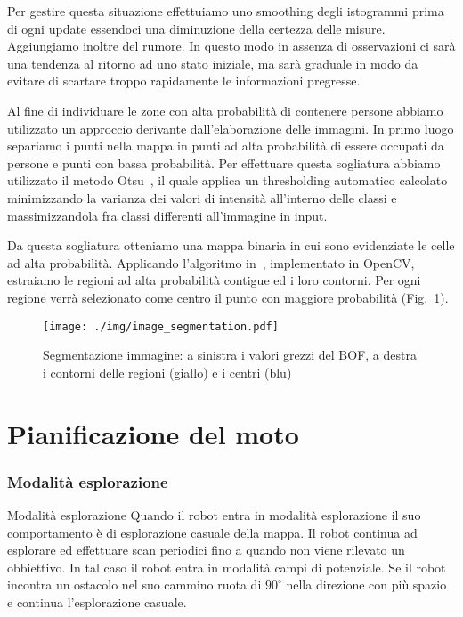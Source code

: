 \documentclass[10pt]{beamer}
\begin{document}
	Per gestire questa situazione effettuiamo uno smoothing degli istogrammi
	prima di ogni update essendoci una diminuzione della certezza delle misure.
	Aggiungiamo inoltre del rumore. In questo modo in assenza di osservazioni
	ci sarà una tendenza al ritorno ad uno stato iniziale, ma sarà graduale in
	modo da evitare di scartare troppo rapidamente le informazioni pregresse.

	Al fine di individuare le zone con alta probabilità di contenere persone
	abbiamo utilizzato un approccio derivante dall'elaborazione delle immagini.
	In primo luogo separiamo i punti nella mappa in punti ad alta probabilità
	di essere occupati da persone e punti con bassa probabilità. Per effettuare
	questa sogliatura abbiamo utilizzato il metodo Otsu~\cite{otsu}, il quale
	applica un thresholding automatico calcolato minimizzando la varianza dei
	valori di intensità all'interno delle classi e massimizzandola fra classi
	differenti all'immagine in input.  
	
	Da questa sogliatura otteniamo una mappa binaria in cui sono evidenziate le
	celle ad alta probabilità. Applicando l'algoritmo in~\cite{contours},
	implementato in OpenCV, estraiamo le regioni ad alta probabilità contigue
	ed i loro contorni. Per ogni regione verrà selezionato come centro il punto
	con maggiore probabilità (Fig.~\ref{fig:image_segmentation}).

	\begin{figure}[H]
		\centering
		\texttt{[image: ./img/image\_segmentation.pdf]}
		\caption{Segmentazione immagine: a sinistra i valori grezzi del BOF, a destra i contorni delle regioni (giallo) e i centri (blu) }
		\label{fig:image_segmentation}
	\end{figure}

	\section{Pianificazione del moto}\label{sec:Pianificazione-del-moto}
	\frame{\sectionpage}
	
	\subsubsection{Modalità esplorazione}\label{subsec:Modalita-esplorazione}
	\begin{frame}{Modalità esplorazione}
		Quando il robot entra in modalità esplorazione il suo comportamento è
		di esplorazione casuale della mappa. Il robot continua ad esplorare ed
		effettuare scan periodici fino a quando non viene rilevato un
		obbiettivo.  In tal caso il robot entra in modalità campi di
		potenziale. Se il robot incontra un ostacolo nel suo cammino ruota di
		$90^{\circ}$ nella direzione con più spazio e continua l'esplorazione
		casuale.
	\end{frame}
	
\end{document}
